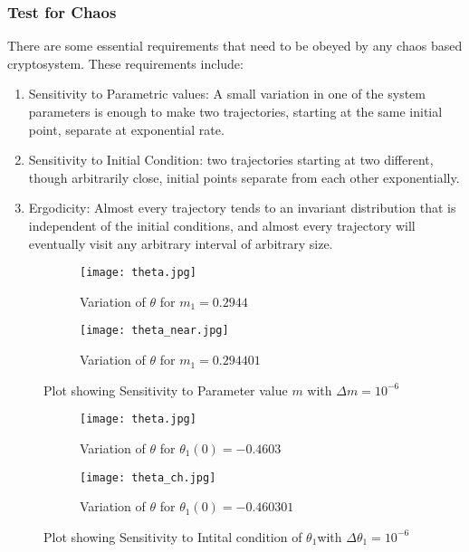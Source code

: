 \subsubsection{Test for Chaos}
There are some essential requirements that need to be obeyed by any chaos based cryptosystem. These requirements include:
\begin{enumerate}
	\item Sensitivity to Parametric values: A small variation in one of the system parameters is enough to make two trajectories, starting at the same initial point, separate at exponential rate.
	\item Sensitivity to Initial  Condition:  two  trajectories  starting  at  two  different,  though  arbitrarily  close,  initial points separate from each other exponentially.
	\item Ergodicity:  Almost every trajectory tends to an invariant distribution that is independent of the initial conditions, and almost every trajectory will eventually visit any arbitrary interval of arbitrary size.
\end{enumerate}

\begin{figure}[H]
\begin{subfigure}{0.5\textwidth}
\texttt{[image: theta.jpg]}
\caption{Variation of ${\theta}$ for ${m_{1}=0.2944}$}\label{fig:theta_comp}
\end{subfigure}
\begin{subfigure}{0.5\textwidth}
\texttt{[image: theta\_near.jpg]}
\caption{Variation of ${\theta}$ for ${m_{1}=0.294401}$}\label{fig:trajectory_near_comp}
\end{subfigure}
\caption{Plot showing Sensitivity to Parameter value ${m}$ with ${\Delta m = 10^{-6}}$}\label{fig:image6}
\end{figure}

\begin{figure}[H]
\begin{subfigure}{0.5\textwidth}
\texttt{[image: theta.jpg]}
\caption{Variation of ${\theta}$ for ${\theta_{1}(0)=-0.4603}$}\label{fig:theta_comp}
\end{subfigure}
\begin{subfigure}{0.5\textwidth}
\texttt{[image: theta\_ch.jpg]}
\caption{Variation of ${\theta}$ for ${\theta_{1}(0)=-0.460301}$}\label{fig:theta_ch_comp}
\end{subfigure}
\caption{Plot showing Sensitivity to Intital condition of ${\theta_{1}}$with ${\Delta \theta_{1} = 10^{-6}}$}\label{fig:image7}
\end{figure}

